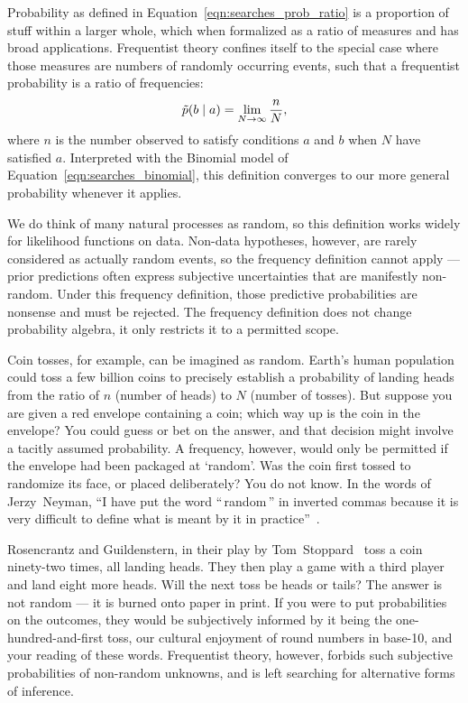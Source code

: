 \noindent Probability as defined in Equation~\ref{eqn:searches_prob_ratio} is a
proportion of stuff within a larger whole, which when formalized as a ratio
of measures and has broad applications.
Frequentist theory confines itself to the special case where those measures
are numbers of randomly occurring events, such that a frequentist
probability is a ratio of frequencies:
\begin{equation}
\label{eqn:searches_prob_frequency_ratio}
\tilde{p}(b\mid a) = \lim_{N \to \infty}\frac{n}{N},
\end{equation}
where $n$ is the number observed to satisfy conditions $a$ and $b$ when
$N$ have satisfied $a$.
Interpreted with the Binomial model of
Equation~\ref{eqn:searches_binomial}, this definition converges to our more
general probability whenever it applies.

We do think of many natural processes as random, so this definition works
widely for likelihood functions on data.
Non-data hypotheses, however, are rarely considered as actually random events,
so the frequency definition cannot apply ---
prior predictions often express subjective uncertainties that are manifestly
non-random.
Under this frequency definition, those predictive probabilities are nonsense
and must be rejected.
The frequency definition does not change probability algebra, it only restricts
it to a permitted scope.

Coin tosses, for example, can be imagined as random.
Earth's human population could toss a few billion coins to precisely
establish a probability of landing heads from the ratio of
$n$ (number of heads) to $N$ (number of tosses).
But suppose you are given a red envelope containing a coin;
which way up is the coin in the envelope?
You could guess or bet on the answer, and that decision might involve a tacitly
assumed probability.
A frequency, however, would only be permitted if the envelope had been packaged
at `random'.
Was the coin first tossed to randomize its face, or placed deliberately?
You do not know.
In the words of Jerzy~Neyman,
``I have put the word ``\,random\,'' in inverted commas because it is very
difficult to define what is meant by it in practice''~\cite{
Neyman1937Outline
}.

Rosencrantz and Guildenstern, in their play by Tom~Stoppard~\cite{
stoppard1967rosencrantz
}
toss a coin ninety-two times, all landing heads.
They then play a game with a third player and land eight more heads.
Will the next toss be heads or tails?
The answer is not random --- it is burned onto paper in print.
If you were to put probabilities on the outcomes, they would be subjectively
informed by it being the one-hundred-and-first toss, our cultural enjoyment
of round numbers in base-10, and your reading of these words.
Frequentist theory, however, forbids such subjective probabilities of
non-random unknowns, and is left searching for alternative forms of inference.

